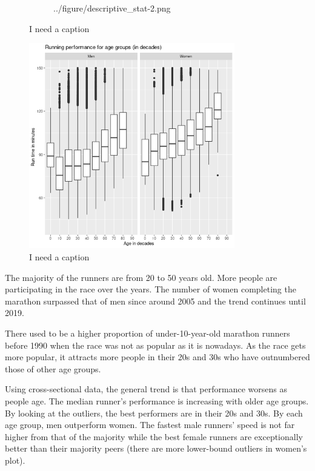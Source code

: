 \documentclass[12pt]{article}
\begin{document}
\begin{figure}
\begin{subfigure}{0.49\textwidth}
		{../figure/descriptive_stat-2.png}
		\caption{}
		\label{age-dist-2}
	\end{subfigure}
	\caption{I need a caption}
	\label{age-dist}
\end{figure}

\begin{figure}[ht]
	\centering
	\includegraphics[width = 0.8\textwidth]
	{../figure/boxplot_runtime_age-1.png}
	\caption{I need a caption}
	\label{box-plot}
\end{figure}

The majority of the runners are from 20 to 50 years old.
More people are participating in the race over the years.
The number of women completing the marathon surpassed that of men since
around 2005 and the trend continues until 2019.

There used to be a higher proportion of under-10-year-old marathon
runners before 1990 when the race was not as popular as it is nowadays.
As the race gets more popular, it attracts more people in their 20s and 30s
who have outnumbered those of other age groups.

Using cross-sectional data, the general trend is that performance worsens as
people age. The median runner's performance is increasing with older age groups.
By looking at the outliers, the best performers are in their 20s and 30s.
By each age group, men outperform women.
The fastest male runners' speed is not far higher from that of the majority
while the best female runners are exceptionally better than their majority
peers (there are more lower-bound outliers in women's plot).
\end{document}
